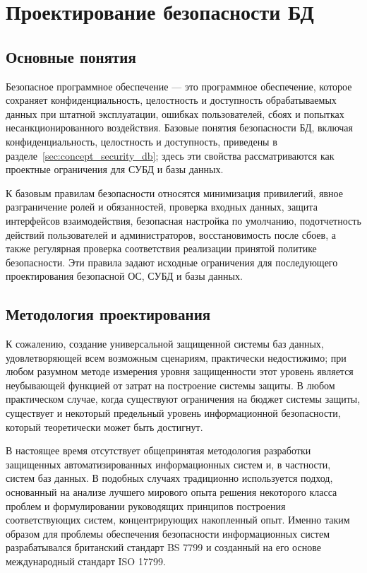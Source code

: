 \section{Проектирование безопасности БД}

\subsection{Основные понятия}

Безопасное программное обеспечение --- это программное обеспечение, которое сохраняет конфиденциальность, целостность и доступность обрабатываемых данных при штатной эксплуатации, ошибках пользователей, сбоях и попытках несанкционированного воздействия. Базовые понятия безопасности БД, включая конфиденциальность, целостность и доступность, приведены в разделе~\ref{sec:concept_security_db}; здесь эти свойства рассматриваются как проектные ограничения для СУБД и базы данных.

К базовым правилам безопасности относятся минимизация привилегий, явное разграничение ролей и обязанностей, проверка входных данных, защита интерфейсов взаимодействия, безопасная настройка по умолчанию, подотчетность действий пользователей и администраторов, восстановимость после сбоев, а также регулярная проверка соответствия реализации принятой политике безопасности. Эти правила задают исходные ограничения для последующего проектирования безопасной ОС, СУБД и базы данных.

\subsection{Методология проектирования}
К сожалению, создание универсальной защищенной системы баз данных, удовлетворяющей всем возможным сценариям, практически недостижимо; при любом
разумном методе измерения уровня защищенности этот уровень является неубывающей функцией
от затрат на построение системы защиты. В любом практическом случае, когда существуют
ограничения на бюджет системы защиты, существует и некоторый предельный уровень
информационной безопасности, который теоретически может быть достигнут.

В настоящее время отсутствует общепринятая методология разработки защищенных
автоматизированных информационных систем и, в частности, систем баз данных. В подобных
случаях традиционно используется подход, основанный на анализе лучшего мирового опыта
решения некоторого класса проблем и формулировании руководящих принципов построения
соответствующих систем, концентрирующих накопленный опыт. Именно таким образом для проблемы
обеспечения безопасности информационных систем разрабатывался британский стандарт BS 7799
и созданный на его основе международный стандарт ISO 17799.


